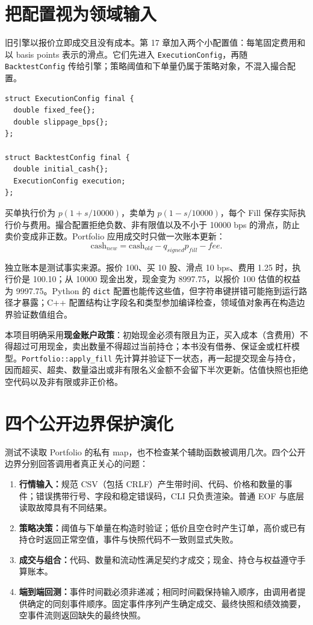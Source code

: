 \section{把配置视为领域输入}

旧引擎以报价立即成交且没有成本。第 17 章加入两个小配置值：每笔固定费用和以 basis points 表示的滑点。它们先进入 \texttt{ExecutionConfig}，再随 \texttt{BacktestConfig} 传给引擎；策略阈值和下单量仍属于策略对象，不混入撮合配置。

\begin{lstlisting}[caption={省略上下文：成本配置沿目标边界传递}]
struct ExecutionConfig final {
  double fixed_fee{};
  double slippage_bps{};
};

struct BacktestConfig final {
  double initial_cash{};
  ExecutionConfig execution;
};
\end{lstlisting}

买单执行价为 \(p(1+s/10000)\)，卖单为 \(p(1-s/10000)\)，每个 Fill 保存实际执行价与费用。撮合配置拒绝负数、非有限值以及不小于 10000 bps 的滑点，防止卖价变成非正数。Portfolio 应用成交时只做一次账本更新：
\[
\text{cash}_{new}=\text{cash}_{old}-q_{signed}p_{fill}-fee.
\]

独立账本是测试事实来源。报价 100、买 10 股、滑点 10 bps、费用 1.25 时，执行价是 100.10；从 10000 现金出发，现金变为 8997.75，以报价 100 估值的权益为 9997.75。Python 的 \texttt{dict} 配置也能传这些值，但字符串键拼错可能拖到运行路径才暴露；C++ 配置结构让字段名和类型参加编译检查，领域值对象再在构造边界验证数值组合。

本项目明确采用\textbf{现金账户政策}：初始现金必须有限且为正，买入成本（含费用）不得超过可用现金，卖出数量不得超过当前持仓；本书没有借券、保证金或杠杆模型。\texttt{Portfolio::apply\_fill} 先计算并验证下一状态，再一起提交现金与持仓，因而超买、超卖、数量溢出或非有限名义金额不会留下半次更新。估值快照也拒绝空代码以及非有限或非正价格。

\section{四个公开边界保护演化}

测试不读取 Portfolio 的私有 map，也不检查某个辅助函数被调用几次。四个公开边界分别回答调用者真正关心的问题：

\begin{enumerate}
  \item \textbf{行情输入：}规范 CSV（包括 CRLF）产生带时间、代码、价格和数量的事件；错误携带行号、字段和稳定错误码，CLI 只负责渲染。普通 EOF 与底层读取故障具有不同结果。
  \item \textbf{策略决策：}阈值与下单量在构造时验证；低价且空仓时产生订单，高价或已有持仓时返回正常空值，事件与快照代码不一致则显式失败。
  \item \textbf{成交与组合：}代码、数量和流动性满足契约才成交；现金、持仓与权益遵守手算账本。
  \item \textbf{端到端回测：}事件时间戳必须非递减；相同时间戳保持输入顺序，由调用者提供确定的同刻事件顺序。固定事件序列产生确定成交、最终快照和绩效摘要，空事件流则返回缺失的最终快照。
\end{enumerate}


